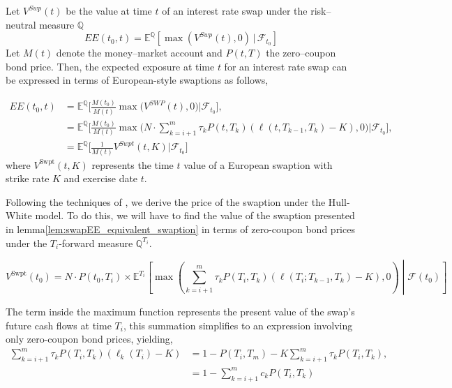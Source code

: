     \begin{lemma}\label{lem:swapEE_equivalent_swaption}
    
    Let $V^{Swp}(t)$ be the value at time $t$ of an interest rate swap under the risk–neutral measure $\mathbb{Q}$\\
    \[
    EE(t_0,t) = \mathbb{E}^{\mathbb{Q}}\!\left[\max\!\left(V^{Swp}(t),0\right)\,\Big|\,\mathcal{F}_{t_0}\right]
    \]
     \noindent
     Let $M(t)$ denote the money–market account and $P(t,T)$ the zero–coupon bond price. Then, the expected exposure at time $t$ for an interest rate swap can be expressed in terms of European-style swaptions as follows,

    \begin{align*}
        EE(t_0,t)  &= \mathbb{E}^{\mathbb{Q}} \Bigg[ \frac{M(t_0)}{M(t)} \max \Big( V^{SWP}(t),0 \Big) \Big| \mathcal{F}_{t_0} \Bigg],\\
        &= \mathbb{E}^{\mathbb{Q}} \Bigg[ \frac{M(t_0)}{M(t)} \max \Big(N \cdot \sum_{k=i+1}^{m} \tau_{k} P(t,T_k) (\ell(t,T_{k-1},T_k) - K),0 \Big) \Big| \mathcal{F}_{t_0} \Bigg],\\
        &= \mathbb{E}^{\mathbb{Q}} \Big[ \frac{1}{M(t)} V^{Swpt}(t,K) \Big | \mathcal{F}_{t_0}\Big]
    \end{align*}
   where $V^{\text{Swpt}}(t, K)$ represents the time $t$ value of a European swaption with strike rate $K$ and exercise date $t$.
    
    \end{lemma}

    \noindent
    Following the techniques of \cite{jamshidian1989exact}, we derive the price of the swaption under the Hull-White model. To do this, we will have to find the value of the swaption presented in lemma\ref{lem:swapEE_equivalent_swaption} in terms of zero-coupon bond prices under the $T_i$-forward measure $\mathbb{Q}^{T_i}$.

    \begin{equation}
    V^{\text{Swpt}}(t_0) = N \cdot P(t_0, T_i) \times \mathbb{E}^{T_i} \left[ \max \left( \sum_{k=i+1}^m \tau_k P(T_i, T_k) \left( \ell(T_i; T_{k-1}, T_k) - K \right), 0 \right) \middle| \mathcal{F}(t_0) \right]
    \end{equation}

    \noindent
    The term inside the maximum function represents the present value of the swap's future cash flows at time $T_i$, this summation simplifies to an expression involving only zero-coupon bond prices, yielding,
    \begin{align}
    \sum_{k=i+1}^m \tau_k P(T_i, T_k) \left( \ell_k(T_i) - K \right) &= 1 - P(T_i, T_m) - K \sum_{k=i+1}^m \tau_k P(T_i, T_k),\\
    &= 1 - \sum_{k=i+1}^m c_k P(T_i, T_k)
    \end{align}

